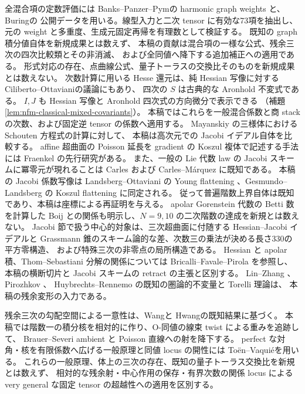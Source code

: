 \documentclass[11pt,a4paper]{ltjsarticle}
\numberwithin{equation}{section}
\begin{document}
全混合項の定数評価には
Banks--Panzer--Pym\cite[Corollary~1.3; Section~6]{NFMBanksPanzerPym}の
harmonic graph weights と、Buring\cite[Sections~3.4--3.6]{NFMBuringGraphs}の
公開データを用いる。線型入力と二次 tensor に有効な73項を抽出し、
元の weight と多重度、生成元固定再帰を有理数として検証する。
既知の graph 積分値自体を新規成果とは数えず、
本稿の貢献は混合項の一様な公式、残余三次の四次比較類とその非消滅、
および全同値へ降下する追加補正への適用である。
形式対応の存在、点曲線公式、量子トーラスの交換比そのものを新規成果とは数えない。
次数計算に用いる Hesse 還元は、純 Hessian 写像に対する
Ciliberto--Ottaviani\cite[Theorem~5.7]{NFMCilibertoOttaviani}の議論にもあり、
四次の $S$ は古典的な Aronhold 不変式\cite{NFMOttavianiAronhold}である。
$I,J$ も Hessian 写像と Aronhold 四次式の方向微分で表示できる
（補題\ref{lem:nfm-classical-mixed-covariants}）。
本稿ではこれらを一般混合係数と商 stack の次数、および固定逆 tensor の係数へ適用する。
Mayanskiy \cite{Mayanskiy} の三様体における Schouten 方程式の計算に対して、
本稿は高次元での Jacobi イデアル自体を比較する。
affine 超曲面の Poisson 延長を gradient の Koszul 複体で記述する手法には
Fraenkel \cite[Proposition~4.1, Theorem~4.3]{Fraenkel} の先行研究がある。
また、一般の Lie 代数 law の Jacobi スキームに冪零元が現れることは
Carles \cite[Section~8, Lemma~8.35]{Carles} および
Carles--M\'arquez \cite[Section~3]{CarlesMarquez} に既知である。
本稿の Jacobi 係数写像は Landsberg--Ottaviani の Young flattening
\cite{LandsbergOttavianiYoung}、Gesmundo--Landsberg の Koszul flattening
\cite[Proposition~6.1]{GesmundoLandsbergPartials}に同定される。
従って普遍階数上界自体は既知であり、本稿は座標による再証明を与える。
apolar Gorenstein 代数の Betti 数を計算した Boij \cite[Remark~6]{NFMBoijBetti}
との関係も明示し、$N=9,10$ の二次階数の達成を新規とは数えない。
Jacobi 節で扱う中心的対象は、三次超曲面に付随する Hessian--Jacobi イデアルと
Grassmann 錐のスキーム論的な差、次数三の乗法が決める長さ330の平方零構造、
および特殊三次の非零点の局所構造である。
Hessian と apolar 積、Thom--Sebastiani 分解の関係については
Bricalli--Favale--Pirola \cite[Proposition~2.1, Theorem~3.4]{NFMBFFHessian}を参照し、
本稿の横断切片と Jacobi スキームの retract の主張と区別する。
Lin--Zhang \cite{NFLZSerre}、Pirozhkov \cite{NFPirozhkov}、
Huybrechts--Rennemo \cite{NFHuybrechtsRennemo} の既知の圏論的不変量と Torelli 理論は、
本稿の残余変形の入力である。

残余三次の勾配空間による一意性は、Wang\cite[Theorem~3.3]{NFMWangMilnor}と
Hwang\cite[Theorems~1.5, 1.6]{NFMHwangSymmetrizer}の既知結果に基づく。
本稿では階数一の積分核を相対的に作り、O-同値の線束 twist による重みを追跡して、
Brauer--Severi ambient と Poisson 直線への射を降下する。
perfect な対角・核を有限係数へ広げる一般原理と同値 locus の開性には
To\"en--Vaqui\'e\cite[Lemmas~2.10, 3.25]{NFMToenVaquieModuli}を用いる。
これらの一般原理、体上の三次の存在、既知の量子トーラス交換比を新規とは数えず、
相対的な残余射・中心作用の保存・有界次数の関係 locus による
very general な固定 tensor の超越性への適用を区別する。
\end{document}
